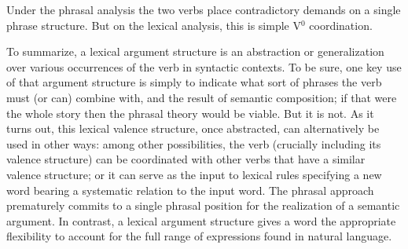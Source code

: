 \documentclass[output=paper]{langsci/langscibook}
\begin{document}
\noindent
Under the phrasal analysis the two verbs place contradictory demands on a single phrase structure.  But on the lexical analysis, this is simple V$^0$ coordination.   
 
To summarize, a lexical argument structure is an abstraction or generalization over various occurrences of the verb in syntactic contexts. To be sure, one key use of that argument structure is simply to indicate what sort of phrases the verb must (or can) combine with, and the result of semantic composition; if that were the whole story then the phrasal theory would be viable. But it is not. As it turns out, this lexical valence structure, once abstracted, can alternatively be used in other ways: among other possibilities, the verb (crucially including its valence structure) can be coordinated with other verbs that have a similar valence structure; or it can serve as the input to lexical rules specifying a new word bearing a systematic relation to the input word.   The phrasal approach prematurely commits to a single phrasal position for the realization of 
a semantic argument.  In contrast, a lexical argument structure gives a word the appropriate flexibility to account for the full range of expressions found in natural language.   
 
 

%
{\sloppy
\printbibliography[heading=subbibliography,notkeyword=this] 
}
\end{document}
